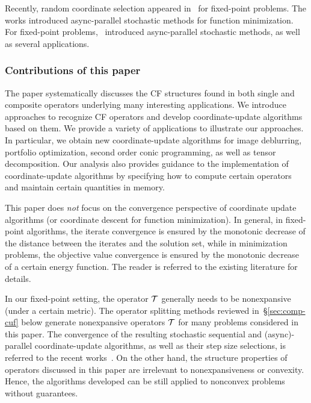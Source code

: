 Recently, random coordinate selection appeared in~\cite{Patrick_2015} for fixed-point problems. The works \cite{nedic2001distributed,recht2011hogwild,liu2013asynchronous,liu2014asynchronous,hsieh2015passcode} introduced async-parallel stochastic methods for function minimization.
For fixed-point problems,~\cite{Peng_2015_AROCK} introduced  async-parallel stochastic methods, as well as several applications.  

\subsubsection{Contributions of this paper} 
The paper systematically discusses the CF structures found in both single and composite operators underlying many interesting applications. We introduce approaches to recognize CF operators and develop coordinate-update algorithms based on them. 
We provide a variety of applications to illustrate our approaches. 
In particular, we obtain new coordinate-update algorithms for image deblurring, portfolio optimization, second order conic programming, as well as tensor decomposition. Our analysis also provides guidance to the implementation of coordinate-update algorithms by specifying how to compute certain operators and maintain certain quantities in memory. 
 
This paper does \emph{not} focus on the convergence perspective of coordinate update algorithms (or coordinate descent for function minimization). In general, in fixed-point algorithms, the iterate convergence is ensured by the monotonic decrease of the distance between the iterates and the solution set, while in minimization problems, the objective value convergence is ensured by the monotonic decrease of a certain energy function. The reader is referred to the existing literature for details. 


In our fixed-point setting, the operator ${\mathcal{T}}$ generally needs to be  nonexpansive (under a certain metric). The operator splitting methods reviewed in~\S\ref{sec:comp-cuf} below generate nonexpansive operators ${\mathcal{T}}$ for many problems considered in this paper. The convergence of the resulting stochastic sequential and  (async)-parallel coordinate-update algorithms, as well as their step size selections, is referred to the recent works~\cite{Patrick_2015,Peng_2015_AROCK}. On the other hand, the structure properties of operators discussed in this paper are irrelevant to nonexpansiveness or convexity. Hence, the algorithms developed can be still applied to nonconvex problems without guarantees.


